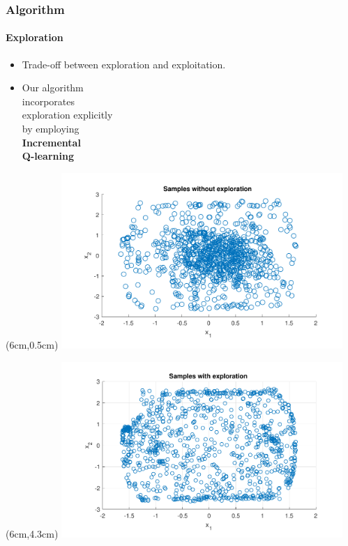 \documentclass[t]{beamer}
\begin{document}
\begin{frame}
\frametitle{Algorithm}
\framesubtitle{Exploration}
\begin{itemize}
\item Trade-off between \linebreak exploration and \linebreak exploitation.
\item Our algorithm \\ incorporates \\ exploration explicitly \\ by employing \\ \textbf{Incremental} \\ \textbf{Q-learning}
\end{itemize}

\begin{textblock*}{8cm}(6cm,0.5cm) %
\includegraphics[width=0.8\textwidth]{Unexploration_samples}
\end{textblock*}
\begin{textblock*}{8cm}(6cm,4.3cm) %
\includegraphics[width=0.8\textwidth]{Exploration_samples}
\end{textblock*}


\end{frame}
\end{document}
